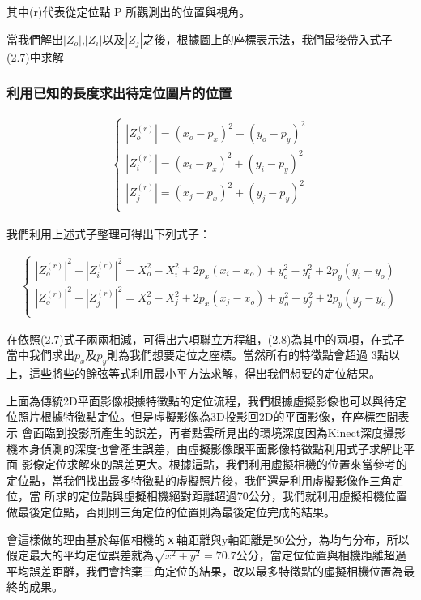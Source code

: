 	其中(r)代表從定位點 P 所觀測出的位置與視角。	
	
	當我們解出$|Z_o|$,$|Z_i|$以及$|Z_j|$之後，根據圖上的座標表示法，我們最後帶入式子(2.7)中求解
	
	\subsubsection{利用已知的長度求出待定位圖片的位置}
	
	\begin{align}
		\left\{
		\begin{array}{cccc}
		|Z_o^{(r)}| = (x_o - p_x)^2 + (y_o - p_y)^2\\
		|Z_i^{(r)}| = (x_i - p_x)^2 + (y_i - p_y)^2\\
		|Z_j^{(r)}| = (x_j - p_x)^2 + (y_j - p_y)^2\\
		\end{array}
		\right.
	\end{align}	
	
	我們利用上述式子整理可得出下列式子：
	
	\begin{align}
		\left\{
		\begin{array}{cccc}
		|Z_o^{(r)}|^2 - |Z_i^{(r)}|^2 = X_o^2 - X_i^2 + 2p_x(x_i - x_o) + y_o^2 - y_i^2 + 2p_y(y_i-y_o)\\
		|Z_o^{(r)}|^2 - |Z_j^{(r)}|^2 = X_o^2 - X_j^2 + 2p_x(x_j - x_o) + y_o^2 - y_j^2 + 2p_y(y_j-y_o)\\
		\end{array}
		\right.
	\end{align}	
	
	在依照(2.7)式子兩兩相減，可得出六項聯立方程組，(2.8)為其中的兩項，在式子當中我們求出$p_x$及$p_y$則為我們想要定位之座標。當然所有的特徵點會超過
	3點以上，這些將些的餘弦等式利用最小平方法求解，得出我們想要的定位結果。
	
    上面為傳統2D平面影像根據特徵點的定位流程，我們根據虛擬影像也可以與待定位照片根據特徵點定位。但是虛擬影像為3D投影回2D的平面影像，在座標空間表示
    會面臨到投影所產生的誤差，再者點雲所見出的環境深度因為Kinect深度攝影機本身偵測的深度也會產生誤差，由虛擬影像跟平面影像特徵點利用式子求解比平面
    影像定位求解來的誤差更大。根據這點，我們利用虛擬相機的位置來當參考的定位點，當我們找出最多特徵點的虛擬照片後，我們還是利用虛擬影像作三角定位，當
    所求的定位點與虛擬相機絕對距離超過70公分，我們就利用虛擬相機位置做最後定位點，否則則三角定位的位置則為最後定位完成的結果。
    
    會這樣做的理由基於每個相機的ｘ軸距離與y軸距離是50公分，為均勻分布，所以假定最大的平均定位誤差就為$\sqrt{x^2+y^2}=70.7$公分，當定位位置與相機距離超過
    平均誤差距離，我們會捨棄三角定位的結果，改以最多特徵點的虛擬相機位置為最終的成果。

